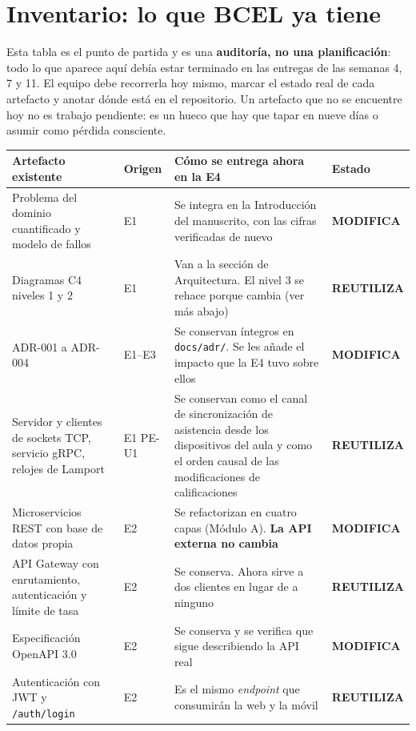 \documentclass[11pt,a4paper]{article}
\newcommand{\reuso}{\cellcolor{filaReuso}\textbf{REUTILIZA}}
\newcommand{\cambia}{\cellcolor{filaCambia}\textbf{MODIFICA}}
\begin{document}
\section{Inventario: lo que BCEL ya tiene}

Esta tabla es el punto de partida y es una \textbf{auditoría, no una planificación}: todo lo que aparece aquí debía estar terminado en las entregas de las semanas 4, 7 y 11. El equipo debe recorrerla hoy mismo, marcar el estado real de cada artefacto y anotar dónde está en el repositorio. Un artefacto que no se encuentre hoy no es trabajo pendiente: es un hueco que hay que tapar en nueve días o asumir como pérdida consciente.

\begin{center}
	\footnotesize
	\begin{longtable}{@{}p{3.7cm}p{1.5cm}p{5.2cm}p{4.4cm}@{}}
		\toprule
		\textbf{Artefacto existente} & \textbf{Origen} & \textbf{Cómo se entrega ahora en la E4} & \textbf{Estado} \\
		\midrule
		\endhead
		Problema del dominio cuantificado y modelo de fallos & E1 & Se integra en la Introducción del manuscrito, con las cifras verificadas de nuevo & \cambia \\
		\addlinespace
		Diagramas C4 niveles 1 y 2 & E1 & Van a la sección de Arquitectura. El nivel 3 se rehace porque cambia (ver más abajo) & \reuso \\
		\addlinespace
		ADR-001 a ADR-004 & E1--E3 & Se conservan íntegros en \texttt{docs/adr/}. Se les añade el impacto que la E4 tuvo sobre ellos & \cambia \\
		\addlinespace
		Servidor y clientes de sockets TCP, servicio gRPC, relojes de Lamport & E1 \newline PE-U1 & Se conservan como el canal de sincronización de asistencia desde los dispositivos del aula y como el orden causal de las modificaciones de calificaciones & \reuso \\
		\addlinespace
		Microservicios REST con base de datos propia & E2 & Se refactorizan en cuatro capas (Módulo A). \textbf{La API externa no cambia} & \cambia \\
		\addlinespace
		API Gateway con enrutamiento, autenticación y límite de tasa & E2 & Se conserva. Ahora sirve a dos clientes en lugar de a ninguno & \reuso \\
		\addlinespace
		Especificación OpenAPI 3.0 & E2 & Se conserva y se verifica que sigue describiendo la API real & \cambia \\
		\addlinespace
		Autenticación con JWT y \texttt{/auth/login} & E2 & Es el mismo \emph{endpoint} que consumirán la web y la móvil & \reuso \\

\end{longtable}
\end{center}
\end{document}
